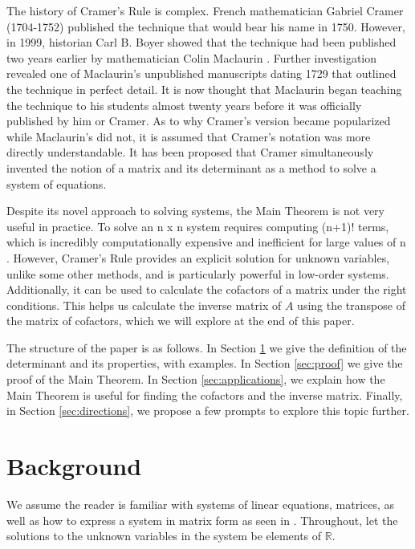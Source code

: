 \documentclass[11pt,reqno]{amsart}
\theoremstyle{definition}
\begin{document}
The history of Cramer’s Rule is complex. French mathematician Gabriel Cramer (1704-1752) published the technique that would bear his name in 1750. However, in 1999, historian Carl B. Boyer showed that the technique had been published two years earlier by mathematician Colin Maclaurin \cite{history}. Further investigation revealed one of Maclaurin’s unpublished manuscripts dating 1729 that outlined the technique in perfect detail. It is now thought that Maclaurin began teaching the technique to his students almost twenty years before it was officially published by him or Cramer. As to why Cramer’s version became popularized while Maclaurin’s did not, it is assumed that Cramer’s notation was more directly understandable. It has been proposed that Cramer simultaneously invented the notion of a matrix and its determinant as a method to solve a system of equations\cite{muir}. 

Despite its novel approach to solving systems, the Main Theorem is not very useful in practice. To solve an n x n system requires computing (n+1)! terms, which is incredibly computationally expensive and inefficient for large values of n \cite[Chapter 5.3]{strang}. However, Cramer’s Rule provides an explicit solution for unknown variables, unlike some other methods, and is particularly powerful in low-order systems. Additionally, it can be used to calculate the cofactors of a matrix under the right conditions. This helps us calculate the inverse matrix of $A$ using the transpose of the matrix of cofactors, which we will explore at the end of this paper. 


The structure of the paper is as follows. In Section \ref{sec:background} we give the definition of the determinant and its properties, with examples. In Section \ref{sec:proof} we give the proof of the Main Theorem. In Section \ref{sec:applications}, we explain how the Main Theorem is useful for finding the cofactors and the inverse matrix. Finally, in Section \ref{sec:directions}, we propose a few prompts to explore this topic further.


\section{Background}
\label{sec:background}

We assume the reader is familiar with systems of linear equations, matrices, as well as how to express a system in matrix form as seen in \cite[Chapters 1 and 2]{strang}. Throughout, let the solutions to the unknown variables in the system be elements of $\mathbb{R}$. 
\end{document}
